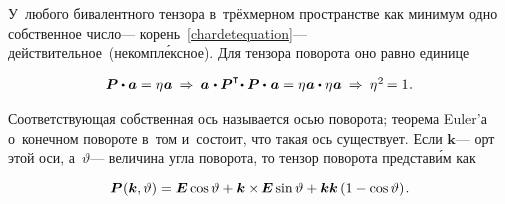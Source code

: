 \begin{otherlanguage}{russian}
У~любого бивалентного тензора в~трёхмерном пространстве как минимум одно собственное число\:--- корень~\eqref{chardetequation}\:--- действительное~(некомпл\'{е}ксное).
Для тензора поворота оно равно единице

\nopagebreak\vspace{-0.1em}\begin{equation*}\begin{array}{c}
\bm{P} \dotp \bm{a} = \eigenvalue \bm{a} \:\Rightarrow\:
\tikzmark{BeginPaBrace} \bm{a} \hspace{.16ex} \dotp \tikzmark{BeginEBrace} \bm{P}^{\T} \tikzmark{EndPaBrace} \hspace{-0.4ex} \dotp \bm{P} \hspace{-0.32ex}\tikzmark{EndEBrace}\hspace{.32ex} \dotp \hspace{.16ex} \bm{a} = \eigenvalue \bm{a} \dotp \eigenvalue \bm{a}
\:\Rightarrow\: \eigenvalue^{2} \hspace{-0.2ex} = 1 \hspace{.1ex} .
\end{array}\end{equation*}

\vspace{-0.5em} \noindent Соответствующая собственная ось называется осью поворота; теорема Euler’а о~конечном повороте в~том и~состоит, что такая ось существует. Если ${\bm{k}}$\:--- орт этой оси, а~${\vartheta}$\:--- величина угла поворота, то тензор поворота представ\'{и}м как

\nopagebreak\vspace{-0.1em}\begin{equation}\label{eulerfiniterotation}
\bm{P}\hspace{.1ex}(\bm{k},\vartheta) = \bm{E} \operatorname{cos} \vartheta + \bm{k} \times\hspace{-0.2ex} \bm{E} \operatorname{sin} \vartheta + \bm{k} \bm{k} \left({1 - \operatorname{cos} \vartheta}\right) \hspace{-0.2ex} .
\end{equation}


\end{otherlanguage}
